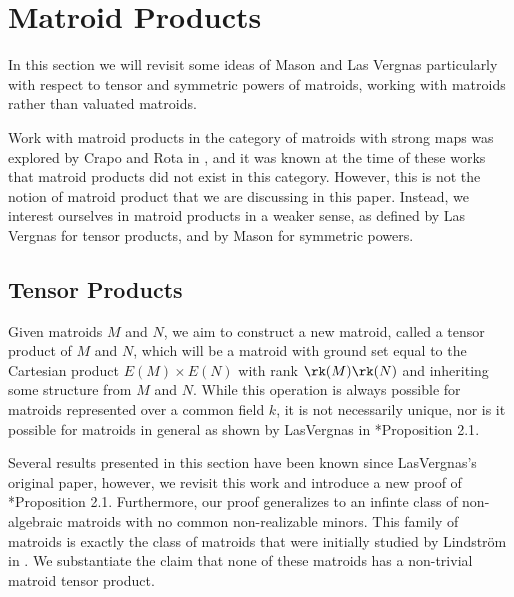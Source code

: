\section{Matroid Products}\label{sec:MatProds}

In this section we will revisit some ideas of Mason \cite{MGlueing} and Las Vergnas \cite{LV81} particularly with respect to tensor and symmetric powers of matroids, working with matroids rather than valuated matroids.
   
Work with matroid products in the category of matroids with strong maps was explored by Crapo and Rota in \cite{CR70}, and it was known at the time of these works that matroid products did not exist in this category. However, this is not the notion of matroid product that we are discussing in this paper. Instead, we interest ourselves in matroid products in a weaker sense, as defined by Las Vergnas for tensor products, and by Mason for symmetric powers.
\subsection{Tensor Products}\label{subsec:tensorProducts}
    Given matroids $M$ and $N$, we aim to construct a new matroid, called a tensor product of $M$ and $N$, which will be a matroid with ground set equal to the Cartesian product $E(M)\times E(N)$ with rank $\rk(M)\rk(N)$ and inheriting some structure from $M$ and $N$. While this operation is always possible for matroids represented over a common field $k$, it is not necessarily unique, nor is it  possible for matroids in general as shown by LasVergnas in \cite{LV81}*{Proposition 2.1}. 
    
    Several results presented in this section have been known since LasVergnas's original paper, however, we revisit this work and introduce a new proof of \cite{LV81}*{Proposition 2.1}. Furthermore, our proof generalizes to an infinte class of non-algebraic matroids with no common non-realizable minors. This family of matroids is exactly the class of matroids that were initially studied by Lindstr\"om in \cite{Lind88}. We substantiate the claim that none of these matroids has a non-trivial matroid tensor product.
    
